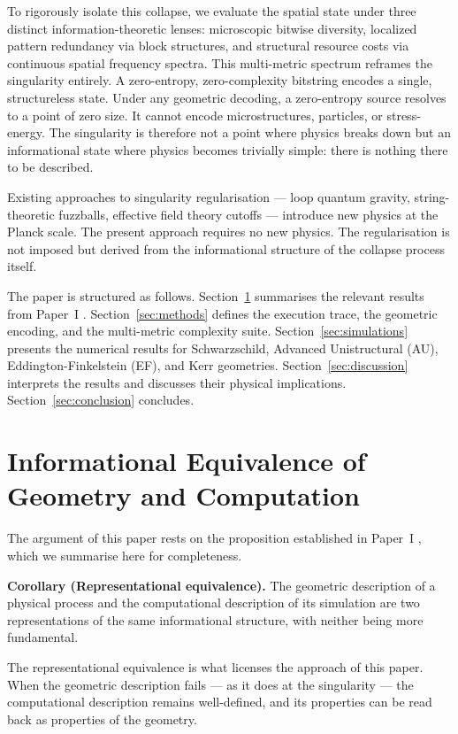 \documentclass[11pt]{article}
\begin{document}
To rigorously isolate this collapse, we evaluate the spatial state under three 
distinct information-theoretic lenses: microscopic bitwise diversity, localized pattern 
redundancy via block structures, and structural resource costs via continuous 
spatial frequency spectra. This multi-metric spectrum reframes the singularity entirely. 
A zero-entropy, zero-complexity bitstring encodes a single, structureless state. Under 
any geometric decoding, a zero-entropy source resolves to a point of zero size. 
It cannot encode microstructures, particles, or stress-energy. The singularity is therefore
not a point where physics breaks down but an informational state where
physics becomes trivially simple: there is nothing there to be described.

Existing approaches to singularity regularisation --- loop quantum gravity,
string-theoretic fuzzballs, effective field theory cutoffs --- introduce new
physics at the Planck scale. The present approach requires no new physics.
The regularisation is not imposed but derived from the informational
structure of the collapse process itself.

The paper is structured as follows. Section~\ref{sec:framework} summarises
the relevant results from Paper~I \cite{meskanen2001}.
Section~\ref{sec:methods} defines the
execution trace, the geometric encoding, and the multi-metric complexity suite.
Section~\ref{sec:simulations} presents the numerical results for
Schwarzschild, Advanced Unistructural (AU), Eddington-Finkelstein (EF), and Kerr geometries. 
Section~\ref{sec:discussion} interprets the results and discusses their physical implications. 
Section~\ref{sec:conclusion} concludes.

\section{Informational Equivalence of Geometry and Computation}
\label{sec:framework}

The argument of this paper rests on the proposition established in
Paper~I \cite{meskanen2001}, which we summarise here for completeness.

\textbf{Corollary (Representational equivalence).} The geometric description of a
physical process and the computational description of its simulation are two
representations of the same informational structure, with neither being more fundamental.

The representational equivalence is what licenses the approach of this
paper. When the geometric description fails --- as it does at the singularity
--- the computational description remains well-defined, and its properties
can be read back as properties of the geometry.
\end{document}

